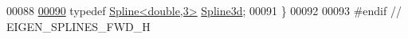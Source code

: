 \begin{DoxyCode}
00088     
\hyperlink{namespace_eigen_a652b0c454d2123a13f04922404bed782}{00090}     \textcolor{keyword}{typedef} \hyperlink{group___splines___module_class_eigen_1_1_spline}{Spline<double,3>} \hyperlink{namespace_eigen_a652b0c454d2123a13f04922404bed782}{Spline3d};
00091 \}
00092 
00093 \textcolor{preprocessor}{#endif // EIGEN\_SPLINES\_FWD\_H}
\end{DoxyCode}
